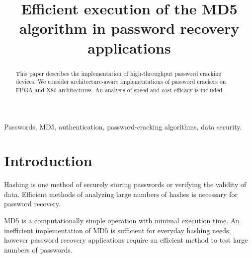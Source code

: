 


\title{Efficient execution of the MD5 algorithm in password recovery applications}

\author{
}

\maketitle


\begin{abstract}
This paper describes the implementation of high-throughput password cracking devices. We consider architecture-aware implementations of password crackers on FPGA and X86 architectures. An analysis of speed and cost efficacy is included. 

\end{abstract}

\begin{IEEEkeywords}
Passwords, MD5, authentication, password-cracking algorithms, data security.
\end{IEEEkeywords}

\section{Introduction}
	Hashing is one method of securely storing passwords or verifying the validity of data. Efficient methods of analyzing large numbers of hashes is necessary for password recovery.  

	MD5 is a computationally simple operation with minimal execution time. An inefficient implementation of MD5 is sufficient for everyday hashing needs, however password recovery applications require an efficient method to test large numbers of passwords. 

